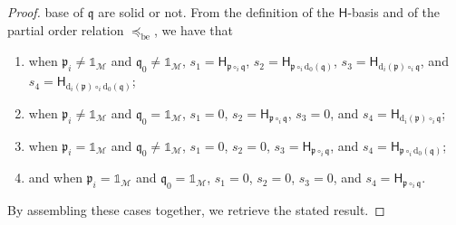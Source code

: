 \documentclass[10pt,reqno]{amsart}
\numberwithin{equation}{subsection}
\newcommand{\Mca}{\mathcal{M}}
\newcommand{\Hsf}{\mathsf{H}}
\newcommand{\Pfr}{\mathfrak{p}}
\newcommand{\Qfr}{\mathfrak{q}}
\newcommand{\Unit}{\mathds{1}}
\newcommand{\OrdBE}{\preceq_{\mathrm{be}}}
\newcommand{\Del}{\mathrm{d}}
\begin{document}
\begin{proof}
    base of $\Qfr$ are solid or not. From the definition of the
    $\Hsf$-basis and of the partial order relation $\OrdBE$, we have
    that
    \begin{enumerate}[fullwidth,label=(\alph*)]
        \item when $\Pfr_i \ne \Unit_\Mca$ and $\Qfr_0 \ne \Unit_\Mca$,
        $s_1 = \Hsf_{\Pfr \circ_i \Qfr}$,
        $s_2 = \Hsf_{\Pfr \circ_i \Del_0(\Qfr)}$,
        $s_3 = \Hsf_{\Del_i(\Pfr) \circ_i \Qfr}$, and
        $s_4 = \Hsf_{\Del_i(\Pfr) \circ_i \Del_0(\Qfr)}$;
        \item when $\Pfr_i \ne \Unit_\Mca$ and $\Qfr_0 = \Unit_\Mca$,
        $s_1 = 0$, $s_2 = \Hsf_{\Pfr \circ_i \Qfr}$,
        $s_3 = 0$, and $s_4 = \Hsf_{\Del_i(\Pfr) \circ_i \Qfr}$;
        \item when $\Pfr_i = \Unit_\Mca$ and $\Qfr_0 \ne \Unit_\Mca$,
        $s_1 = 0$, $s_2 = 0$, $s_3 = \Hsf_{\Pfr \circ_i \Qfr}$, and
        $s_4 = \Hsf_{\Pfr \circ_i \Del_0(\Qfr)}$;
        \item and when $\Pfr_i = \Unit_\Mca$ and $\Qfr_0 = \Unit_\Mca$,
        $s_1 = 0$, $s_2 = 0$, $s_3 = 0$, and
        $s_4 = \Hsf_{\Pfr \circ_i \Qfr}$.
    \end{enumerate}
    By assembling these cases together, we retrieve the stated result.
\end{proof}
\medskip
\end{document}
